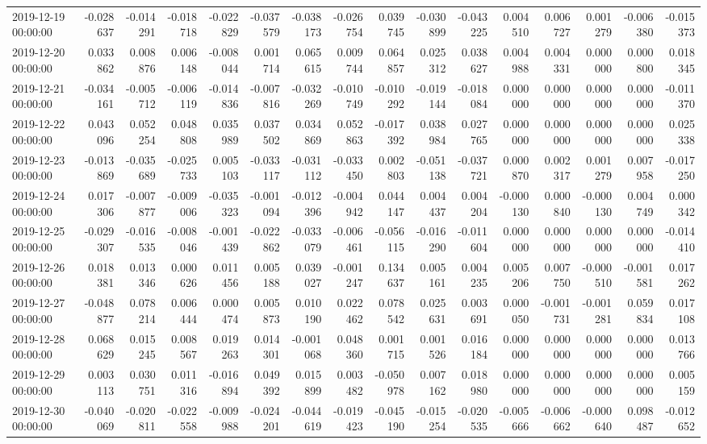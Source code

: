 \begin{tabular}{lrrrrrrrrrrrrrrr}
2019-12-19 00:00:00 & -0.028637 & -0.014291 & -0.018718 & -0.022829 & -0.037579 & -0.038173 & -0.026754 & 0.039745 & -0.030899 & -0.043225 & 0.004510 & 0.006727 & 0.001279 & -0.006380 & -0.015373 \\
2019-12-20 00:00:00 & 0.033862 & 0.008876 & 0.006148 & -0.008044 & 0.001714 & 0.065615 & 0.009744 & 0.064857 & 0.025312 & 0.038627 & 0.004988 & 0.004331 & 0.000000 & 0.000800 & 0.018345 \\
2019-12-21 00:00:00 & -0.034161 & -0.005712 & -0.006119 & -0.014836 & -0.007816 & -0.032269 & -0.010749 & -0.010292 & -0.019144 & -0.018084 & 0.000000 & 0.000000 & 0.000000 & 0.000000 & -0.011370 \\
2019-12-22 00:00:00 & 0.043096 & 0.052254 & 0.048808 & 0.035989 & 0.037502 & 0.034869 & 0.052863 & -0.017392 & 0.038984 & 0.027765 & 0.000000 & 0.000000 & 0.000000 & 0.000000 & 0.025338 \\
2019-12-23 00:00:00 & -0.013869 & -0.035689 & -0.025733 & 0.005103 & -0.033117 & -0.031112 & -0.033450 & 0.002803 & -0.051138 & -0.037721 & 0.000870 & 0.002317 & 0.001279 & 0.007958 & -0.017250 \\
2019-12-24 00:00:00 & 0.017306 & -0.007877 & -0.009006 & -0.035323 & -0.001094 & -0.012396 & -0.004942 & 0.044147 & 0.004437 & 0.004204 & -0.000130 & 0.000840 & -0.000130 & 0.004749 & 0.000342 \\
2019-12-25 00:00:00 & -0.029307 & -0.016535 & -0.008046 & -0.001439 & -0.022862 & -0.033079 & -0.006461 & -0.056115 & -0.016290 & -0.011604 & 0.000000 & 0.000000 & 0.000000 & 0.000000 & -0.014410 \\
2019-12-26 00:00:00 & 0.018381 & 0.013346 & 0.000626 & 0.011456 & 0.005188 & 0.039027 & -0.001247 & 0.134637 & 0.005161 & 0.004235 & 0.005206 & 0.007750 & -0.000510 & -0.001581 & 0.017262 \\
2019-12-27 00:00:00 & -0.048877 & 0.078214 & 0.006444 & 0.000474 & 0.005873 & 0.010190 & 0.022462 & 0.078542 & 0.025631 & 0.003691 & 0.000050 & -0.001731 & -0.001281 & 0.059834 & 0.017108 \\
2019-12-28 00:00:00 & 0.068629 & 0.015245 & 0.008567 & 0.019263 & 0.014301 & -0.001068 & 0.048360 & 0.001715 & 0.001526 & 0.016184 & 0.000000 & 0.000000 & 0.000000 & 0.000000 & 0.013766 \\
2019-12-29 00:00:00 & 0.003113 & 0.030751 & 0.011316 & -0.016894 & 0.049392 & 0.015899 & 0.003482 & -0.050978 & 0.007162 & 0.018980 & 0.000000 & 0.000000 & 0.000000 & 0.000000 & 0.005159 \\
2019-12-30 00:00:00 & -0.040069 & -0.020811 & -0.022558 & -0.009988 & -0.024201 & -0.044619 & -0.019423 & -0.045190 & -0.015254 & -0.020535 & -0.005666 & -0.006662 & -0.000640 & 0.098487 & -0.012652 \\

\end{tabular}
